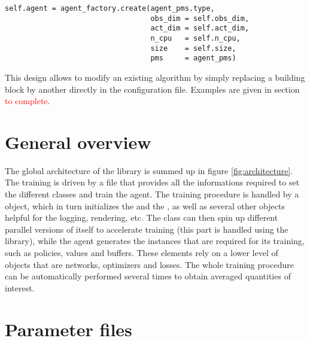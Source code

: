 \begin{verbatim}
self.agent = agent_factory.create(agent_pms.type,
                                  obs_dim = self.obs_dim,
                                  act_dim = self.act_dim,
                                  n_cpu   = self.n_cpu,
                                  size    = self.size,
                                  pms     = agent_pms)
\end{verbatim}

This design allows to modify an existing algorithm by simply replacing a building block by another directly in the  configuration file. Examples are given in section \textcolor{red}{to complete}.

\section{General overview}
\label{section:general_overview}

The global architecture of the library is summed up in figure \ref{fig:architecture}. The training is driven by a  file that provides all the informations required to set the different classes and train the agent. The training procedure is handled by a  object, which in turn initializes the  and the , as well as several other objects helpful for the logging, rendering, etc. The  class can then spin up different parallel versions of itself to accelerate training (this part is handled using the  library), while the agent generates the instances that are required for its training, such as policies, values and buffers. These elements rely on a lower level of objects that are networks, optimizers and losses. The whole training procedure can be automatically performed several times to obtain averaged quantities of interest.



\section{Parameter files}
\label{section:parameter_files}

